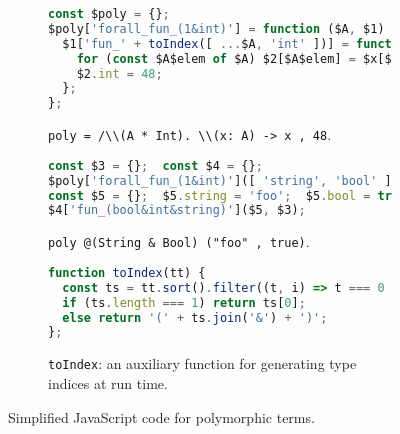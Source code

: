 \begin{figure}
\begin{subfigure}{\textwidth}
\begin{lstlisting}[language=TypeScript]
const $poly = {};
$poly['forall_fun_(1&int)'] = function ($A, $1) {
  $1['fun_' + toIndex([ ...$A, 'int' ])] = function ($x, $2) {
    for (const $A$elem of $A) $2[$A$elem] = $x[$A$elem];
    $2.int = 48;
  };
};
\end{lstlisting}
\caption{\lstinline{poly = /\\(A * Int). \\(x: A) -> x , 48}.} \label{fig:poly-def}
\end{subfigure}
\par\bigskip
\begin{subfigure}{\textwidth}
\begin{lstlisting}[language=TypeScript,deletekeywords=string]
const $3 = {};  const $4 = {};
$poly['forall_fun_(1&int)']([ 'string', 'bool' ], $4);
const $5 = {};  $5.string = 'foo';  $5.bool = true;
$4['fun_(bool&int&string)']($5, $3);
\end{lstlisting}
\caption{\lstinline{poly @(String & Bool) ("foo" , true)}.} \label{fig:poly-app}
\end{subfigure}
\par\bigskip
\begin{subfigure}{\textwidth}
\begin{lstlisting}[language=TypeScript]
function toIndex(tt) {
  const ts = tt.sort().filter((t, i) => t === 0 || t !== tt[i-1]);
  if (ts.length === 1) return ts[0];
  else return '(' + ts.join('&') + ')';
};
\end{lstlisting}
\caption{\lstinline{toIndex}: an auxiliary function for generating type indices at run time.} \label{fig:toIndex}
\end{subfigure}
\caption{Simplified JavaScript code for polymorphic terms.}
\end{figure}

